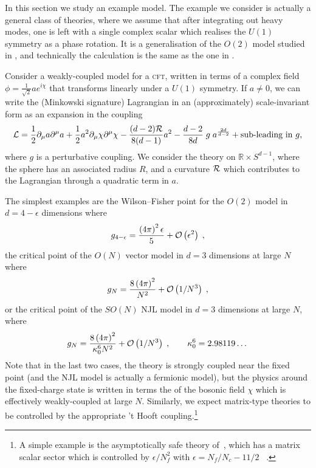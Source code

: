 \documentclass[11pt]{article}
\numberwithin{equation}{section}
\begin{document}
In this section we study an example model. The example we consider is actually a general class of theories, where we assume that after integrating out heavy modes, one is left with a single complex scalar which realises the $U(1)$ symmetry as a phase rotation. It is a generalisation of the $O(2)$ model studied in \cite{Badel:2019oxl}, and technically the calculation is the same as the one in \cite{Badel:2019oxl}. 

Consider a weakly-coupled model for a \textsc{cft}, written in terms of a complex field \(\phi = \frac{1}{\sqrt{2}}a e^{i \chi}\) that transforms linearly under a \(U(1)\) symmetry. 
	If \(a \neq 0\), we can write the (Minkowski signature) Lagrangian in an (approximately) scale-invariant form as an expansion in the coupling
   \begin{equation}
     {\cal L} = \frac{1}{2} \partial_{\mu} a \partial^{\mu} a + \frac{1}{2} a^2 \partial_{\mu} \chi \partial^{\mu} \chi - \frac{(d-2) {\cal R} }{8(d-1)} a^2 - \frac{d-2}{8d} \;g\; a^{\frac{2d}{d-2}} + \text{sub-leading in \(g\),}
     \label{simmdac}
   \end{equation}
   where $g$ is a perturbative coupling. We consider the theory on $\mathbb{R} \times S^{d-1}$, where the sphere has an associated radius $R$, and a curvature ${\cal R}$ which contributes to the Lagrangian through a quadratic term in $a$.  
   
   The simplest examples are the Wilson--Fisher point for the \(O(2)\) model in \(d = 4-\epsilon\) dimensions where
   \begin{equation}
     g_{4-\epsilon} = \frac{\left(4 \pi\right)^{2} \epsilon}{5} + {\cal O}\left(\epsilon^2\right) \; ,
   \end{equation}
   the critical point of the \(O(N)\) vector model in \(d=3\) dimensions at large \(N\) where~\cite{Appelquist:1982vd,Alvarez-Gaume:2019biu,Orlando:2021usz}
   \begin{equation}
     g_{N} = \frac{8\left(4\pi\right)^2}{N^2} + {\cal O}\left(1/N^3\right) \; ,
   \end{equation}
   or the critical point of the \(SO(N)\) NJL model in \(d=3\) dimensions at large \(N\), where~\cite{Dondi:2022zna}
   \begin{equation}
     g_{N} = \frac{8\left(4\pi\right)^2}{\kappa_0^6 N^2} + {\cal O}\left(1/N^3\right) \; , \hspace{2em} \kappa_0^6 = 2.98119\dots
   \end{equation}
   Note that in the last two cases, the theory is strongly coupled near the fixed point (and the NJL model is actually a fermionic model), but the physics around the fixed-charge state is written in terms the of the bosonic field $\chi$ which is effectively weakly-coupled at large $N$. Similarly, we expect matrix-type theories to be controlled by the appropriate 't Hooft coupling.\footnote{A simple example is the asymptotically safe theory of~\cite{Litim:2014uca}, which has a matrix scalar sector which is controlled by $\epsilon/N_f^2$ with $\epsilon = N_f/N_c - 11/2$ ~\cite{Orlando:2019hte}.} 
    
\end{document}
